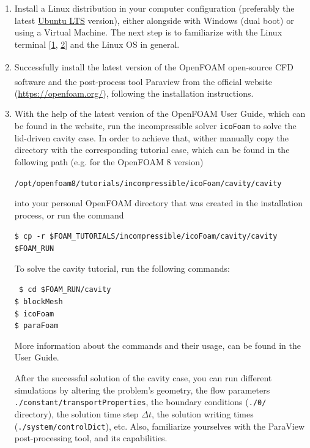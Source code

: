 \documentclass{article}
\newcommand\tab[1][0.5cm]{\hspace*{#1}}
\begin{document}
\begin{enumerate}[label=1.\arabic*]
	
	\item Install a Linux distribution in your computer configuration (preferably the latest \href{https://ubuntu.com/}{Ubuntu LTS} version), either alongside with Windows (dual boot) or using a Virtual Machine. The next step is to familiarize with the Linux terminal [\href{https://ubuntu.com/tutorials/command-line-for-beginners#6-a-bit-of-plumbing}{1}, \href{https://www.howtogeek.com/140679/beginner-geek-how-to-start-using-the-linux-terminal/}{2}] and the Linux OS in general.
	
	\item Successfully install the latest version of the OpenFOAM \textsuperscript{\textcopyright} open-source CFD software and the post-process tool Paraview \textsuperscript{\textcopyright} from the official website (\href{https://openfoam.org/}{https://openfoam.org/}), following the installation instructions.
	
	\item With the help of the latest version of the OpenFOAM User Guide, which can be found in the website, run the incompressible solver {\tt icoFoam} to solve the lid-driven cavity case. In order to achieve that, wither manually copy the directory with the corresponding tutorial case, which can be found in the following path (e.g. for the OpenFOAM 8 version)
	
	{\tt \tab /opt/openfoam8/tutorials/incompressible/icoFoam/cavity/cavity }
	
	into your personal OpenFOAM directory that was created in the installation process, or run the command
	
	{\tt \tab \$ cp -r \$FOAM\_TUTORIALS/incompressible/icoFoam/cavity/cavity \$FOAM\_RUN}
	
	\vspace{0.2cm}
	To solve the cavity tutorial, run the following commands:

	{\tt %
	\tab \$ cd \$FOAM\_RUN/cavity	\\%
	\tab \$ blockMesh \\%
	\tab \$ icoFoam \\%
	\tab \$ paraFoam
 	}
 
 	More information about the commands and their usage, can be found in the User Guide.
 	
 	After the successful solution of the cavity case, you can run different simulations by altering the problem's geometry, the flow parameters {\tt ./constant/transportProperties}, the boundary conditions ({\tt ./0/} directory), the solution time step $\Delta t$, the solution writing times ({\tt ./system/controlDict}), etc. Also, familiarize yourselves with the ParaView post-processing tool, and its capabilities. 
 

\end{enumerate}
\end{document}
